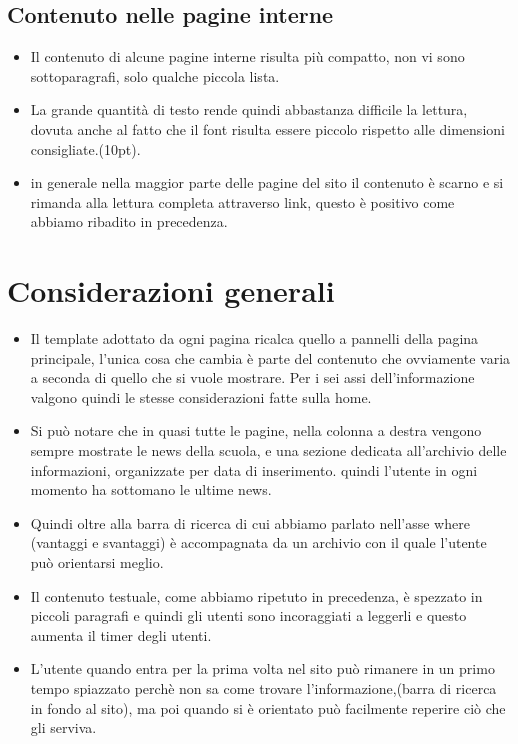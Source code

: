 \documentclass[12pt]{article}
\begin{document}
\subsection{Contenuto nelle pagine interne}
\begin{itemize}

	 \item Il contenuto di alcune pagine interne risulta pi\`u compatto, non vi sono sottoparagrafi, solo qualche piccola lista.

	 \item La grande quantit\`a di testo rende quindi abbastanza difficile la lettura, dovuta anche al fatto che il font risulta essere piccolo rispetto alle dimensioni consigliate.(10pt).
	\item in generale nella maggior parte delle pagine del sito il contenuto \`e scarno e si rimanda alla lettura completa attraverso link, questo \`e positivo come abbiamo ribadito in precedenza.

\end{itemize}

\section{Considerazioni generali}
\begin{itemize}
	\item Il template adottato da ogni pagina ricalca quello a pannelli della pagina principale, l'unica cosa che cambia \`e parte del contenuto che ovviamente varia a seconda di quello che si vuole mostrare. Per i sei assi dell'informazione valgono quindi le stesse considerazioni fatte sulla home.

	\item Si pu\`o notare che in quasi tutte le pagine,  nella colonna a destra vengono sempre mostrate le news della scuola, e una sezione dedicata all'archivio delle informazioni, organizzate per data di inserimento.
	quindi l'utente in ogni momento ha sottomano le ultime news.

	\item Quindi oltre alla barra di ricerca di cui abbiamo parlato nell'asse where (vantaggi e svantaggi) \`e accompagnata da un archivio con il quale l'utente pu\`o orientarsi meglio.

	\item Il contenuto testuale, come abbiamo ripetuto in precedenza, \`e spezzato in piccoli paragrafi e quindi gli utenti sono incoraggiati a leggerli e questo aumenta il timer degli utenti.

	\item L'utente quando entra per la prima volta nel sito pu\`o rimanere in un primo tempo spiazzato perch\`e non sa come trovare l'informazione,(barra di ricerca in fondo al sito), ma poi quando si \`e orientato
	pu\`o facilmente reperire ci\`o che gli serviva.

\end{itemize}
\end{document}
